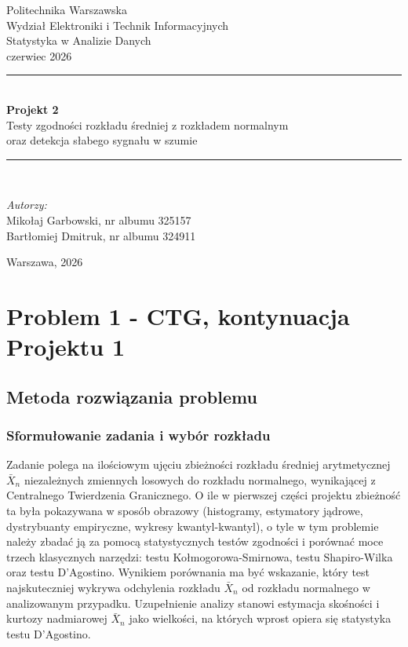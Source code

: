 \documentclass[12pt,a4paper]{article}
\title{}
\author{}
\date{}
\begin{document}
\begin{titlepage}
    \centering
    \vspace*{2cm}

    {\Large Politechnika Warszawska}\\[0.3cm]
    {\large Wydział Elektroniki i Technik Informacyjnych}\\[2cm]

    {\large Statystyka w Analizie Danych}\\[0.5cm]
    {\large czerwiec 2026}\\[1.5cm]

    \rule{\linewidth}{0.5mm}\\[0.4cm]
    {\huge\bfseries Projekt 2}\\[0.3cm]
    {\Large Testy zgodności rozkładu średniej z rozkładem normalnym\\
    oraz detekcja słabego sygnału w szumie}\\[0.2cm]
    \rule{\linewidth}{0.5mm}\\[2cm]

    \begin{flushright}
        \large
        \textit{Autorzy:}\\[0.4cm]
        Mikołaj Garbowski, nr albumu 325157\\
        Bartłomiej Dmitruk, nr albumu 324911\\
    \end{flushright}

    \vfill
    {\large Warszawa, 2026}
\end{titlepage}

\tableofcontents
\newpage

\section{Problem 1 - CTG, kontynuacja Projektu 1}

\subsection{Metoda rozwiązania problemu}

\subsubsection{Sformułowanie zadania i wybór rozkładu}

Zadanie polega na ilościowym ujęciu zbieżności rozkładu średniej arytmetycznej $\bar{X}_n$ niezależnych zmiennych losowych do rozkładu normalnego, wynikającej z Centralnego Twierdzenia Granicznego. O ile w pierwszej części projektu zbieżność ta była pokazywana w sposób obrazowy (histogramy, estymatory jądrowe, dystrybuanty empiryczne, wykresy kwantyl-kwantyl), o tyle w tym problemie należy zbadać ją za pomocą statystycznych testów zgodności i porównać moce trzech klasycznych narzędzi: testu Kołmogorowa-Smirnowa, testu Shapiro-Wilka oraz testu D'Agostino. Wynikiem porównania ma być wskazanie, który test najskuteczniej wykrywa odchylenia rozkładu $\bar{X}_n$ od rozkładu normalnego w analizowanym przypadku. Uzupełnienie analizy stanowi estymacja skośności i kurtozy nadmiarowej $\bar{X}_n$ jako wielkości, na których wprost opiera się statystyka testu D'Agostino.
\end{document}
